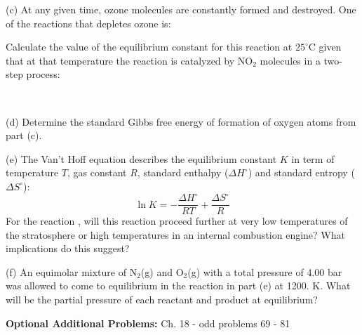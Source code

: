 \documentclass[11pt]{article}
\begin{document}
(c) At any given time, ozone molecules are constantly formed and destroyed. One
of the reactions that depletes ozone is:
\begin{center}
\end{center}
Calculate the value of the equilibrium constant for this reaction at $25^\circ\text{C}$
given that at that temperature the reaction is catalyzed by NO$_2$ molecules in a two-step
process:
\begin{center}
   \\
\end{center}

(d) Determine the standard Gibbs free energy of formation of oxygen atoms from part (c).

(e) The Van't Hoff equation describes the equilibrium constant $K$ in term of temperature
$T$, gas constant $R$, standard enthalpy ($\Delta H^\circ$) and standard entropy
($\Delta S^\circ$):
\begin{equation}
  \ln K = -\frac{\Delta H^\circ}{RT} + \frac{\Delta S^\circ}{R}
\end{equation}
For the reaction , will this reaction proceed further
at very low temperatures of the stratosphere or high temperatures in an internal combustion
engine? What implications do this suggest?

(f) An equimolar mixture of N$_2$(g) and O$_2$(g) with a total pressure of 4.00 bar
was allowed to come to equilibrium in the reaction in part (e) at 1200. K. What will
be the partial pressure of each reactant and product at equilibrium?


\vfill
\textbf{Optional Additional Problems:} Ch. 18 - odd problems 69 - 81
\end{document}

